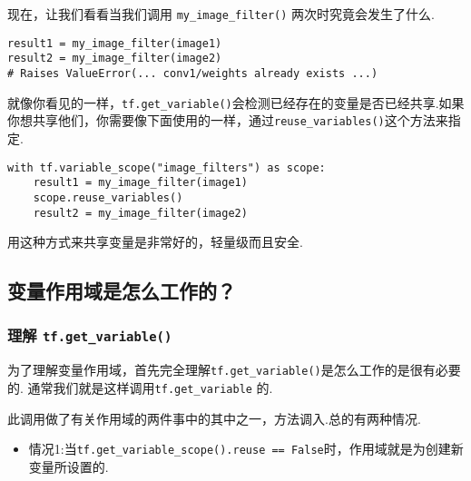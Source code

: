 现在，让我们看看当我们调用 \texttt{my\_image\_filter()}
两次时究竟会发生了什么.

\begin{verbatim}
result1 = my_image_filter(image1)
result2 = my_image_filter(image2)
# Raises ValueError(... conv1/weights already exists ...)
\end{verbatim}

就像你看见的一样，\texttt{tf.get\_variable()}会检测已经存在的变量是否已经共享.如果你想共享他们，你需要像下面使用的一样，通过\texttt{reuse\_variables()}这个方法来指定.

\begin{verbatim}
with tf.variable_scope("image_filters") as scope:
    result1 = my_image_filter(image1)
    scope.reuse_variables()
    result2 = my_image_filter(image2)
\end{verbatim}

用这种方式来共享变量是非常好的，轻量级而且安全.

\subsection{变量作用域是怎么工作的？}\label{ux53d8ux91cfux4f5cux7528ux57dfux662fux600eux4e48ux5de5ux4f5cux7684}

\subsubsection{\texorpdfstring{理解 \texttt{tf.get\_variable()}
}{理解 tf.get\_variable() }}\label{ux7406ux89e3-tf.getux5fvariable}

为了理解变量作用域，首先完全理解\texttt{tf.get\_variable()}是怎么工作的是很有必要的.
通常我们就是这样调用\texttt{tf.get\_variable} 的.

\begin{Shaded}
\begin{Highlighting}[]
\OperatorTok{=} 
\end{Highlighting}
\end{Shaded}

此调用做了有关作用域的两件事中的其中之一，方法调入.总的有两种情况.

\begin{itemize}
\tightlist
\item
  情况1:当\texttt{tf.get\_variable\_scope().reuse\ ==\ False}时，作用域就是为创建新变量所设置的.
\end{itemize}

